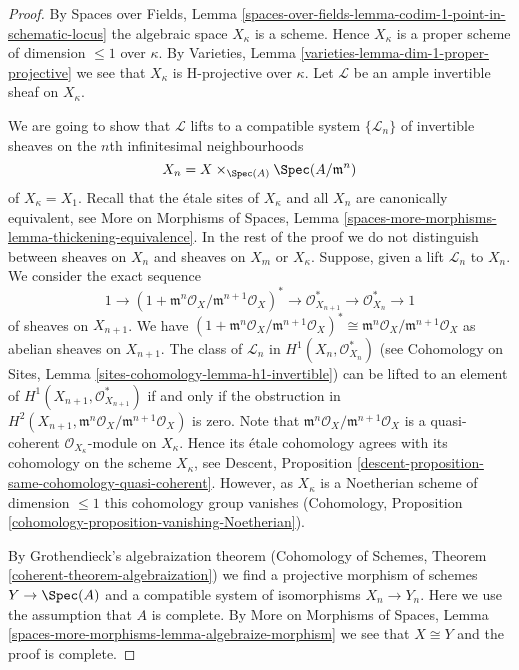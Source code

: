\begin{proof}
By Spaces over Fields, Lemma
\ref{spaces-over-fields-lemma-codim-1-point-in-schematic-locus}
the algebraic space $X_\kappa$ is a scheme. Hence $X_\kappa$
is a proper scheme of dimension $\leq 1$ over $\kappa$.
By Varieties, Lemma \ref{varieties-lemma-dim-1-proper-projective}
we see that $X_\kappa$ is H-projective over $\kappa$.
Let $\mathcal{L}$ be an ample invertible sheaf on $X_\kappa$.

\medskip\noindent
We are going to show that $\mathcal{L}$ lifts to a compatible system
$\{\mathcal{L}_n\}$ of
invertible sheaves on the $n$th infinitesimal neighbourhoods
$$
X_n = X \times_{\Spec(A)} \Spec(A/\mathfrak m^n)
$$
of $X_\kappa = X_1$. Recall that the \'etale sites of $X_\kappa$
and all $X_n$ are canonically equivalent, see
More on Morphisms of Spaces, Lemma
\ref{spaces-more-morphisms-lemma-thickening-equivalence}.
In the rest of the proof we do not distinguish between sheaves on $X_n$
and sheaves on $X_m$ or $X_\kappa$.
Suppose, given a lift $\mathcal{L}_n$ to $X_n$. We consider
the exact sequence
$$
1 \to
(1 + \mathfrak m^n\mathcal{O}_X/\mathfrak m^{n + 1}\mathcal{O}_X)^* \to
\mathcal{O}_{X_{n + 1}}^* \to \mathcal{O}_{X_n}^* \to 1
$$
of sheaves on $X_{n + 1}$. We have
$(1 + \mathfrak m^n\mathcal{O}_X/\mathfrak m^{n + 1}\mathcal{O}_X)^*
\cong \mathfrak m^n\mathcal{O}_X/\mathfrak m^{n + 1}\mathcal{O}_X$
as abelian sheaves on $X_{n + 1}$. The class of $\mathcal{L}_n$ in
$H^1(X_n, \mathcal{O}_{X_n}^*)$ (see
Cohomology on Sites, Lemma \ref{sites-cohomology-lemma-h1-invertible})
can be lifted to an element of $H^1(X_{n + 1}, \mathcal{O}_{X_{n + 1}}^*)$
if and only if the obstruction in
$H^2(X_{n + 1}, \mathfrak m^n\mathcal{O}_X/\mathfrak m^{n + 1}\mathcal{O}_X)$
is zero. Note that
$\mathfrak m^n\mathcal{O}_X/\mathfrak m^{n + 1}\mathcal{O}_X$
is a quasi-coherent $\mathcal{O}_{X_\kappa}$-module on $X_\kappa$.
Hence its \'etale cohomology agrees with its cohomology on the
scheme $X_\kappa$, see
Descent, Proposition \ref{descent-proposition-same-cohomology-quasi-coherent}.
However, as $X_\kappa$ is a Noetherian scheme of dimension $\leq 1$
this cohomology group vanishes (Cohomology, Proposition
\ref{cohomology-proposition-vanishing-Noetherian}).

\medskip\noindent
By Grothendieck's algebraization theorem
(Cohomology of Schemes, Theorem \ref{coherent-theorem-algebraization})
we find a projective morphism of schemes $Y \to \Spec(A)$ and a compatible
system of isomorphisms $X_n \to Y_n$. Here we use the assumption
that $A$ is complete. By
More on Morphisms of Spaces, Lemma
\ref{spaces-more-morphisms-lemma-algebraize-morphism}
we see that $X \cong Y$ and the proof is complete.
\end{proof}


